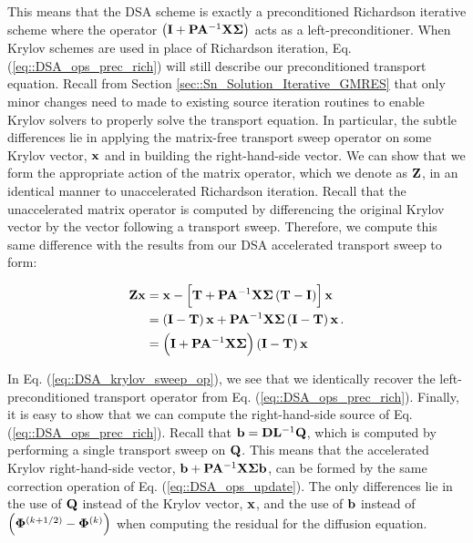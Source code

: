 \noindent This means that the DSA scheme is exactly a preconditioned Richardson iterative scheme where the operator $\left( {\bf I} + {\bf P} {\bf A}^{-1} {\bf X} {\bf \Sigma} \right)$ acts as a left-preconditioner. When Krylov schemes are used in place of Richardson iteration, Eq. (\ref{eq::DSA_ops_prec_rich}) will still describe our preconditioned transport equation. Recall from Section \ref{sec::Sn_Solution_Iterative_GMRES} that only minor changes need to made to existing source iteration routines to enable Krylov solvers to properly solve the transport equation. In particular, the subtle differences lie in applying the matrix-free transport sweep operator on some Krylov vector, ${\bf x}$ and in building the right-hand-side vector. We can show that we form the appropriate action of the matrix operator, which we denote as ${\bf Z}$, in an identical manner to unaccelerated Richardson iteration. Recall that the unaccelerated matrix operator is computed by differencing the original Krylov vector by the vector following a transport sweep. Therefore, we compute this same difference with the results from our DSA accelerated transport sweep to form:

\begin{equation}
\label{eq::DSA_krylov_sweep_op}
\begin{aligned}
{\bf Z} {\bf x} &=  {\bf x} -  \left[ {\bf T}  + {\bf P} {\bf A}^{-1} {\bf X} {\bf \Sigma} \left(  {\bf T}    - {\bf I} \right) \right] {\bf x}\\
&=\left(  {\bf I} - {\bf T} \right){\bf x} + {\bf P} {\bf A}^{-1} {\bf X} {\bf \Sigma} \left(  {\bf I}    - {\bf T} \right) {\bf x} \\
&=\left(  {\bf I} +  {\bf P} {\bf A}^{-1} {\bf X} {\bf \Sigma} \right)  \left(  {\bf I}    - {\bf T} \right)  {\bf x}
\end{aligned} \, .
\end{equation}

\noindent In Eq. (\ref{eq::DSA_krylov_sweep_op}), we see that we identically recover the left-preconditioned transport operator from Eq. (\ref{eq::DSA_ops_prec_rich}). Finally, it is easy to show that we can compute the right-hand-side source of Eq. (\ref{eq::DSA_ops_prec_rich}). Recall that ${\bf b} = {\bf D}{\bf L}^{-1}{\bf Q}$, which is computed by performing a single transport sweep on ${\bf Q}$. This means that the accelerated Krylov right-hand-side vector, ${\bf b} +  {\bf P} {\bf A}^{-1}  {\bf X} {\bf \Sigma}    {\bf b}$, can be formed by the same correction operation of Eq. (\ref{eq::DSA_ops_update}). The only differences lie in the use of ${\bf Q}$ instead of the Krylov vector, ${\bf x}$, and the use of ${\bf b}$ instead of $\left( {\bf \Phi}^{(k+1/2)} - {\bf \Phi}^{(k)}  \right)$ when computing the residual for the diffusion equation.

